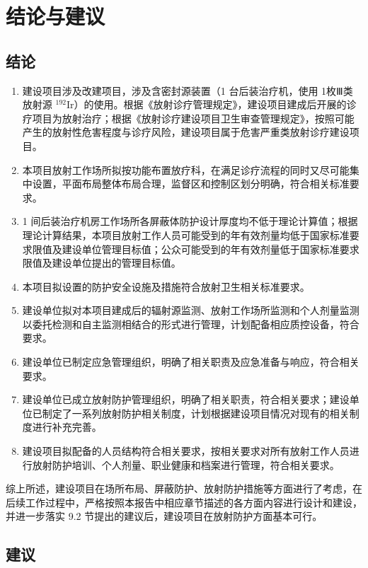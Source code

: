 \chapter{结论与建议}

\section{结论}

\begin{enumerate}
\item 建设项目涉及改建项目，涉及含密封源装置（1 台后装治疗机，使用 1枚Ⅲ类放射源 $^ { 1 9 2 } \mathrm { I r }$）的使用。根据《放射诊疗管理规定》，建设项目建成后开展的诊疗项目为放射治疗；根据《放射诊疗建设项目卫生审查管理规定》，按照可能产生的放射性危害程度与诊疗风险，建设项目属于危害严重类放射诊疗建设项目。
\item 本项目放射工作场所拟按功能布置放疗科，在满足诊疗流程的同时又尽可能集中设置，平面布局整体布局合理，监督区和控制区划分明确，符合相关标准要求。
\item 1 间后装治疗机房工作场所各屏蔽体防护设计厚度均不低于理论计算值；根据理论计算结果，本项目放射工作人员可能受到的年有效剂量均低于国家标准要求限值及建设单位管理目标值；公众可能受到的年有效剂量低于国家标准要求限值及建设单位提出的管理目标值。
\item 本项目拟设置的防护安全设施及措施符合放射卫生相关标准要求。
\item 建设单位拟对本项目建成后的辐射源监测、放射工作场所监测和个人剂量监测以委托检测和自主监测相结合的形式进行管理，计划配备相应质控设备，符合要求。
\item 建设单位已制定应急管理组织，明确了相关职责及应急准备与响应，符合相关要求。
\item 建设单位已成立放射防护管理组织，明确了相关职责，符合相关要求；建设单位已制定了一系列放射防护相关制度，计划根据建设项目情况对现有的相关制度进行补充完善。
\item 建设项目拟配备的人员结构符合相关要求，按相关要求对所有放射工作人员进行放射防护培训、个人剂量、职业健康和档案进行管理，符合相关要求。
\end{enumerate}

综上所述，建设项目在场所布局、屏蔽防护、放射防护措施等方面进行了考虑，在后续工作过程中，严格按照本报告中相应章节描述的各方面内容进行设计和建设，并进一步落实 9.2 节提出的建议后，建设项目在放射防护方面基本可行。

\section{建议}

